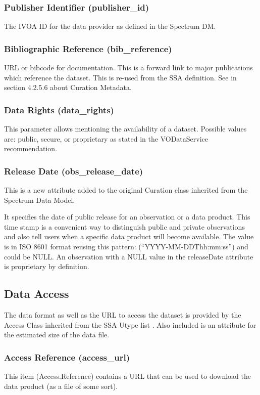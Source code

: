 \documentclass[11pt,a4paper]{ivoa}
\begin{document}
\subsubsection{Publisher Identifier (publisher\_id)}
The IVOA ID for the data provider as defined in the Spectrum DM. 

\subsubsection{Bibliographic Reference (bib\_reference)}
URL or bibcode for documentation. This is a forward link to major publications which reference the dataset.  This is
re-used from the SSA definition. See \citep{2012ivoa.spec.0210T}  in section 4.2.5.6 about Curation Metadata.

\subsubsection{Data Rights (data\_rights)}
This parameter allows mentioning the availability of a dataset.  Possible values are: public, secure, or proprietary as
stated in the VODataService recommendation\citep{2010ivoa.spec.1202P}. 

\subsubsection{Release Date (obs\_release\_date)}
This is a new attribute added to the original Curation class inherited from the Spectrum Data Model. 

It specifies the date of public release for an observation or a data product. This time stamp is a convenient way to
distinguish public and private observations and also tell users when a specific data product will become available. The
value is in ISO 8601 format reusing this pattern: (``YYYY-MM-DDThh:mm:ss{}'') and could be NULL. An observation with a
NULL value in the releaseDate attribute is proprietary by definition.

\subsection{Data Access}
The data format as well as the URL to access the dataset is provided by the Access Class inherited from the SSA Utype
list \citep{2012ivoa.spec.0210T}. Also included is an attribute for the estimated size of the data file. 

\subsubsection{Access Reference (access\_url)}
This item (Access.Reference) contains a URL that can be used to download the data product (as a file of some sort).
\end{document}
